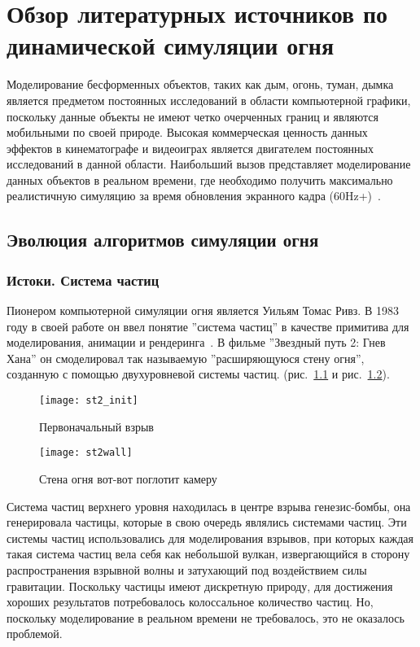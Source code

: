 \chapter{Обзор литературных источников по динамической симуляции огня}%
\label{chap:lit_review}

Моделирование бесформенных объектов, таких как дым, огонь, туман, дымка является
предметом постоянных исследований в области компьютерной графики, поскольку
данные объекты не имеют четко очерченных границ и являются мобильными по своей
природе. Высокая коммерческая ценность данных эффектов в кинематографе и
видеоиграх является двигателем постоянных исследований в данной области.
Наибольший вызов представляет моделирование данных объектов в реальном времени,
где необходимо получить максимально реалистичную симуляцию за время обновления
экранного кадра (60Hz+)~\cite{lec17}.

\section{Эволюция алгоритмов симуляции огня}

\subsection{Истоки. Система частиц}

Пионером компьютерной симуляции огня является Уильям Томас Ривз. В 1983 году в
своей работе он ввел понятие ''система частиц'' в качестве примитива для
моделирования, анимации и рендеринга~\cite{reewes1983}. В фильме ''Звездный путь
2: Гнев Хана'' он смоделировал так называемую ''расширяющуюся стену огня'',
созданную с помощью двухуровневой системы частиц.
(рис.~\ref{fig:reeves_1} и рис.~\ref{fig:reeves_2}).
\begin{figure}[htb]
	\centering
	\texttt{[image: st2\_init]}
	\caption{Первоначальный взрыв}%
    \label{fig:reeves_1}
\end{figure}
\begin{figure}[htb]
	\centering
	\texttt{[image: st2wall]}
	\caption{Стена огня вот-вот поглотит камеру}%
    \label{fig:reeves_2}
\end{figure}

Система частиц верхнего уровня находилась в центре взрыва генезис-бомбы, она
генерировала частицы, которые в свою очередь являлись системами частиц. Эти
системы частиц использовались для моделирования взрывов, при которых каждая
такая система частиц вела себя как небольшой вулкан, извергающийся в сторону
распространения взрывной волны и затухающий под воздействием силы гравитации.
Поскольку частицы имеют дискретную природу, для достижения хороших результатов
потребовалось колоссальное количество частиц. Но, поскольку моделирование в
реальном времени не требовалось, это не оказалось проблемой.

